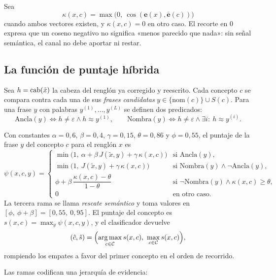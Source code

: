 Sea
\[
  \kappa(x,c)=\max\bigl(0,\ \cos(\mathbf{e}(x),\bar{\mathbf{e}}(c))\bigr)
\]
cuando ambos vectores existen, y $\kappa(x,c)=0$ en otro caso. El recorte en
0 expresa que un coseno negativo no significa «menos parecido que nada»: sin
señal semántica, el canal no debe aportar ni restar.

\subsection{La función de puntaje híbrida}
\label{sec:res-puntaje}

Sea $h=\operatorname{cab}(\tilde x)$ la cabeza del renglón ya corregido y reescrito. Cada
concepto $c$ se compara contra cada una de sus \emph{frases candidatas}
$y\in\{\mathrm{nom}(c)\}\cup S(c)$. Para una frase $y$ con palabras
$y^{(1)},\dots,y^{(L)}$ se definen dos predicados:
\[
  \mathrm{Ancla}(y) \iff h\neq\varepsilon \wedge h\approx y^{(1)},
  \qquad
  \mathrm{Nombra}(y) \iff h\neq\varepsilon \wedge \exists i:\ h\approx y^{(i)}.
\]

\begin{definicion}
\label{def:puntaje}
Con constantes $\alpha=0{,}6$, $\beta=0{,}4$, $\gamma=0{,}15$,
$\theta=0{,}86$ y $\phi=0{,}55$, el puntaje de la frase $y$ del concepto $c$
para el renglón $x$ es
\[
  \psi(x,c,y)=\begin{cases}
    \min\bigl(1,\ \alpha+\beta\,J(\tilde x,y)+\gamma\,\kappa(x,c)\bigr)
      & \text{si } \mathrm{Ancla}(y),\\[2pt]
    \min\bigl(1,\ J(\tilde x,y)+\gamma\,\kappa(x,c)\bigr)
      & \text{si } \mathrm{Nombra}(y)\wedge\neg\mathrm{Ancla}(y),\\[2pt]
    \phi+\beta\,\dfrac{\kappa(x,c)-\theta}{1-\theta}
      & \text{si } \neg\mathrm{Nombra}(y)\wedge\kappa(x,c)\geq\theta,\\[6pt]
    0 & \text{en otro caso.}
  \end{cases}
\]
La tercera rama se llama \emph{rescate semántico} y toma valores en
$[\phi,\ \phi+\beta]=[0{,}55,\ 0{,}95]$. El puntaje del concepto es
$s(x,c)=\max_{y}\psi(x,c,y)$, y el clasificador devuelve
\[
  (\hat c,\hat s)=\Bigl(\argmax_{c\in\Cat}s(x,c),\ \max_{c\in\Cat}s(x,c)\Bigr),
\]
rompiendo los empates a favor del primer concepto en el orden de recorrido.
\end{definicion}

Las ramas codifican una jerarquía de evidencia:

